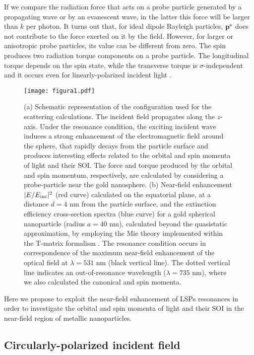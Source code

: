\documentclass[journal=apchd5,manuscript=article]{achemso}
\begin{document}
If we compare the radiation force that acts on a probe particle generated by a propagating wave or by an evanescent wave, in the latter this force will be larger than $k$ per photon. It turns out that, for ideal dipole Rayleigh particles,  ${\bf p}^{\rm s}$ does not contribute to the force exerted on it by the field. However, for larger or anisotropic probe particles, its value can be different from zero. The spin produces two radiation torque components on a probe particle. The longitudinal torque depends on the spin state, while the transverse torque is $\sigma$-independent and it occurs even for linearly-polarized incident light \cite{Bliokh2014}. 

  \begin{figure}[!ht]
  	\centering
  	\texttt{[image: figura1.pdf]}
  	\caption{(a) Schematic representation of the configuration used for the scattering calculations. The incident field propagates along the $z$-axis. Under the resonance condition, the exciting incident wave induces a strong enhancement of the electromagnetic field around the sphere, that rapidly decays  from the particle surface and produces interesting effects related to the orbital and spin momenta of light and their SOI. The force and torque produced by the orbital and spin momentum, respectively, are calculated by considering a probe-particle near the gold nanosphere. (b) Near-field enhancement $|E/E_{\rm inc}|^2$ (red curve) calculated on the equatorial plane, at  a distance $d=4$ nm from the particle surface, and the extinction efficiency cross-section spectra (blue curve) for a gold spherical nanoparticle (radius $a=40$ nm), calculated beyond the quasistatic approximation, by employing the Mie theory implemented within the T-matrix formalism \cite {borghese2007scattering,borghese2013superposition}. The resonance condition occurs in correspondence of the maximum near-field enhancement of the optical field at $\lambda=531$ nm (black vertical line). The dotted vertical line indicates an out-of-resonance wavelength ($\lambda=735$ nm), where we also calculated the canonical and spin momenta.    
  		\label{fig:1}}
  \end{figure}
    
Here we propose to exploit the near-field enhancement of LSPs resonances in order to investigate the orbital and spin momenta of light and their SOI in the near-field region of metallic nanoparticles.

\newpage
\subsection*{Circularly-polarized incident field}
\end{document}
